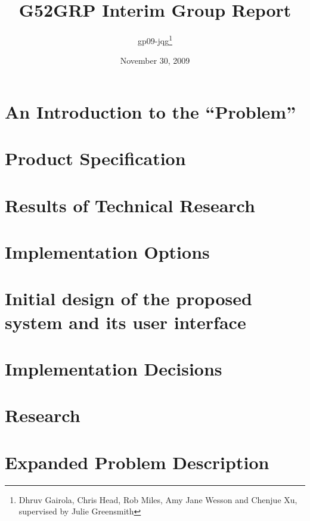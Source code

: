 \documentclass[12pt]{article}
\title{G52GRP Interim Group Report}                     %
\author{gp09-jqg\thanks{Dhruv Gairola, Chris Head, Rob Miles, Amy Jane Wesson and Chenjue Xu, supervised by Julie Greensmith}} %
\date{November 30, 2009}                                    %
\begin{document}
\maketitle                                              %

\tableofcontents
\newpage

\section{An Introduction to the ``Problem''}

\newpage

\section{Product Specification} 			%

\newpage


\section{Results of Technical Research}		%

\newpage

\section{Implementation Options}

\newpage

\section{Initial design of the proposed system and its user interface}

\newpage

\section{Implementation Decisions}

\newpage

\section{Research} %

\newpage

\section{Expanded Problem Description}

\end{document}
